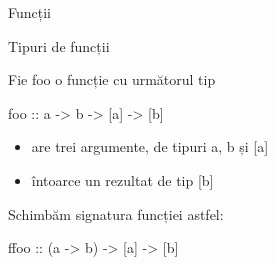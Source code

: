 \documentclass[xcolor=pdftex,romanian,colorlinks]{beamer}
\begin{document}
\begin{section}{Funcții}
%
%
%
%
%
%
%
%
%
%

\begin{frame}[fragile]{Tipuri de funcții}

Fie {foo} o funcție cu următorul tip


\begin{asciihs}
foo :: a -> b -> [a] -> [b]
\end{asciihs}


\begin{itemize}

\item are trei argumente, de tipuri a, b și [a]
\item întoarce un rezultat de tip [b]
\end{itemize}
\pause\bigskip

Schimbăm signatura funcției astfel:

\begin{asciihs}
ffoo :: (a -> b) -> [a] -> [b]
\end{asciihs}



\begin{itemize}


\end{itemize}
\end{frame}
\end{section}
\end{document}
